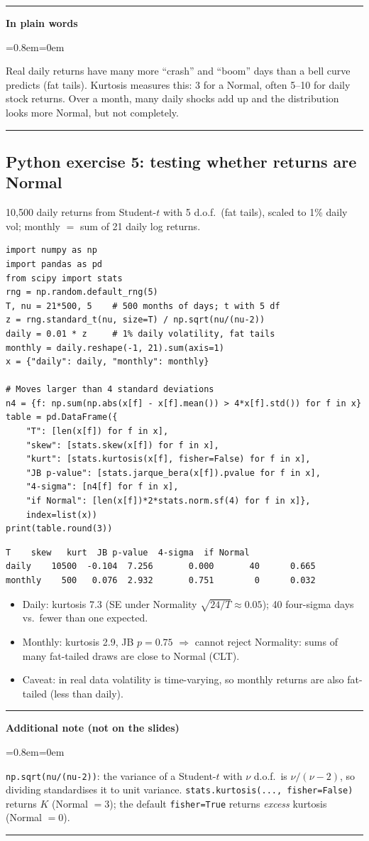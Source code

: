 \documentclass[11pt,a4paper]{report}
\newenvironment{notebox}[1]
  {\par\medskip\Needspace{6\baselineskip}\noindent\rule{\linewidth}{0.4pt}\par\nopagebreak
   \noindent\textbf{#1}\par\nopagebreak
   \begin{list}{}{\leftmargin=0.8em\rightmargin=0em\topsep=2pt}\item[]}
  {\end{list}\nopagebreak\noindent\rule{\linewidth}{0.4pt}\par\medskip}
\newenvironment{plainbox}{\begin{notebox}{In plain words}}{\end{notebox}}
\newenvironment{addnote}{\begin{notebox}{Additional note (not on the slides)}}{\end{notebox}}
\begin{document}
\begin{plainbox}
Real daily returns have many more ``crash'' and ``boom'' days than a bell curve
predicts (fat tails). Kurtosis measures this: 3 for a Normal, often 5--10 for
daily stock returns. Over a month, many daily shocks add up and the distribution
looks more Normal, but not completely.
\end{plainbox}
\subsection*{Python exercise 5: testing whether returns are Normal}
10{,}500 daily returns from Student-$t$ with 5 d.o.f.\ (fat tails), scaled to
1\% daily vol; monthly $=$ sum of 21 daily log returns.
\begin{lstlisting}
import numpy as np
import pandas as pd
from scipy import stats
rng = np.random.default_rng(5)
T, nu = 21*500, 5    # 500 months of days; t with 5 df
z = rng.standard_t(nu, size=T) / np.sqrt(nu/(nu-2))
daily = 0.01 * z     # 1% daily volatility, fat tails
monthly = daily.reshape(-1, 21).sum(axis=1)
x = {"daily": daily, "monthly": monthly}

# Moves larger than 4 standard deviations
n4 = {f: np.sum(np.abs(x[f] - x[f].mean()) > 4*x[f].std()) for f in x}
table = pd.DataFrame({
    "T": [len(x[f]) for f in x],
    "skew": [stats.skew(x[f]) for f in x],
    "kurt": [stats.kurtosis(x[f], fisher=False) for f in x],
    "JB p-value": [stats.jarque_bera(x[f]).pvalue for f in x],
    "4-sigma": [n4[f] for f in x],
    "if Normal": [len(x[f])*2*stats.norm.sf(4) for f in x]},
    index=list(x))
print(table.round(3))
\end{lstlisting}
\begin{lstlisting}[style=out]
             T    skew   kurt  JB p-value  4-sigma  if Normal
daily    10500  -0.104  7.256       0.000       40      0.665
monthly    500   0.076  2.932       0.751        0      0.032
\end{lstlisting}
\begin{itemize}
  \item Daily: kurtosis 7.3 (SE under Normality $\sqrt{24/T}\approx0.05$);
    40 four-sigma days vs.\ fewer than one expected.
  \item Monthly: kurtosis 2.9, JB $p=0.75$ $\Rightarrow$ cannot reject Normality:
    sums of many fat-tailed draws are close to Normal (CLT).
  \item Caveat: in real data volatility is time-varying, so monthly returns
    are also fat-tailed (less than daily).
\end{itemize}
\begin{addnote}
\texttt{np.sqrt(nu/(nu-2))}: the variance of a Student-$t$ with $\nu$ d.o.f.\ is
$\nu/(\nu-2)$, so dividing standardises it to unit variance.
\texttt{stats.kurtosis(..., fisher=False)} returns $K$ (Normal $=3$);
the default \texttt{fisher=True} returns \emph{excess} kurtosis (Normal $=0$).
\end{addnote}
\end{document}
